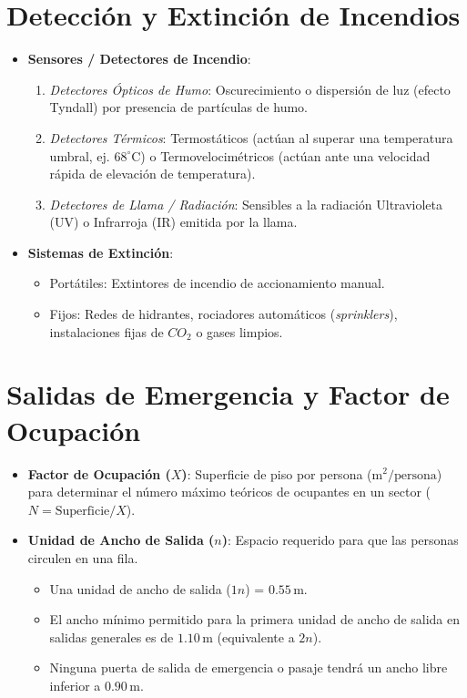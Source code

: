 \documentclass[]{informeutn}
\begin{document}
\section{Detección y Extinción de Incendios}
\begin{itemize}
    \item \textbf{Sensores / Detectores de Incendio}:
    \begin{enumerate}
        \item \textit{Detectores Ópticos de Humo}: Oscurecimiento o dispersión de luz (efecto Tyndall) por presencia de partículas de humo.
        \item \textit{Detectores Térmicos}: Termostáticos (actúan al superar una temperatura umbral, ej. $68^\circ\text{C}$) o Termovelocimétricos (actúan ante una velocidad rápida de elevación de temperatura).
        \item \textit{Detectores de Llama / Radiación}: Sensibles a la radiación Ultravioleta (UV) o Infrarroja (IR) emitida por la llama.
    \end{enumerate}
    \item \textbf{Sistemas de Extinción}:
    \begin{itemize}
        \item Portátiles: Extintores de incendio de accionamiento manual.
        \item Fijos: Redes de hidrantes, rociadores automáticos (\textit{sprinklers}), instalaciones fijas de $CO_2$ o gases limpios.
    \end{itemize}
\end{itemize}

\section{Salidas de Emergencia y Factor de Ocupación}
\begin{itemize}
    \item \textbf{Factor de Ocupación ($X$)}: Superficie de piso por persona ($\text{m}^2/\text{persona}$) para determinar el número máximo teóricos de ocupantes en un sector ($N = \text{Superficie} / X$).
    \item \textbf{Unidad de Ancho de Salida ($n$)}: Espacio requerido para que las personas circulen en una fila. 
    \begin{itemize}
        \item Una unidad de ancho de salida ($1n$) = $0.55\,\text{m}$.
        \item El ancho mínimo permitido para la primera unidad de ancho de salida en salidas generales es de \textbf{$1.10\,\text{m}$} (equivalente a $2n$).
        \item Ninguna puerta de salida de emergencia o pasaje tendrá un ancho libre inferior a $0.90\,\text{m}$.
    \end{itemize}
\end{itemize}
\end{document}
